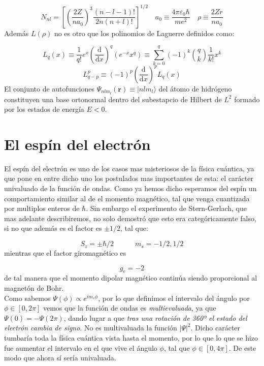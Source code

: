 \documentclass[12pt]{article}
\newcommand{\parentesis}[1]{\left( #1  \right)}
\newcommand{\ccorchetes}[1]{\left[ #1  \right]}
\newcommand{\D}{\mathrm{d}}
\newcommand{\derivadas}[2]{\frac{\D #1}{\D #2}}
\newcommand{\tquad}{\quad \quad \quad}
\newcommand{\rn}{\mathbf{r}}
\begin{document}
\begin{equation}
N_{nl} = \ccorchetes{\parentesis{\dfrac{2Z}{n a_0}}^3\dfrac{(n-l-1)!}{2n (n+l)!}}^{1/2} \quad a_0 \equiv \dfrac{4 \pi \varepsilon_0 \hbar}{m e^2} \quad \rho \equiv \dfrac{2 Z r}{n a_0}
\end{equation}
Además $L(\rho)$ no es otro que los polinomios de Laguerre definidos como:

\begin{equation}
 L_q (x) \equiv \dfrac{1}{q!} e^x \parentesis{\derivadas{}{x}}^q (e^{-x} x^q ) \equiv \sum_{k=0}^{q} (-1)^k  \binom{q}{k} \dfrac{1}{k!} x^k
\end{equation}
\begin{equation}
L_{q-p}^{p} \equiv (-1)^p \parentesis{\derivadas{}{x}}^p L_q(x) 
\end{equation}
El conjunto de autofunciones $\Psi_{n l m_l} (\rn ) \equiv | n l m_l \rangle$ del átomo de hidrógeno constituyen una base ortonormal dentro del subestapcio de Hilbert de $L^2$ formado por los estados de energía $E<0$.

\section{El espín del electrón}

El espín del electrón es uno de los casos mas misteriosos de la física cuántica, ya que pone en entre dicho uno los postulados mas importantes de esta: el carácter univaluado de la función de ondas. Como ya hemos dicho esperamos del espín un comportamiento similar al de el momento magnético, tal que venga cuantizada por multiplos enteros de $\hbar$. Sin embargo el experimento de Stern-Gerlach, que mas adelante describiremos, no solo demostró que esto era categóricamente falso, si no que además es el factor es $\pm 1/2$, tal que:

\begin{equation}
S_z = \pm \hbar / 2 \tquad m_s = -1/2, 1/2
\end{equation}
mientras que el factor giromagnético es

\begin{equation}
g_e = -2
\end{equation}
de tal manera que el momento dipolar magnético continúa siendo proporcional al magnetón de Bohr. \\

Como sabemos $ \Psi (\phi) \varpropto e^{i m_s \phi}$, por lo que definimos el intervalo del ángulo por $\phi \in [0,2\pi]$ vemos que la función de ondas es \textit{multievaluada}, ya que $\Psi(0) = - \Psi (2 \pi)$, dando lugar a que \textit{tras una rotación de 360º el estado del electrón cambia de signo}. No es multivaluada la función $|\Psi|^2$. Dicho carácter tumbaría toda la física cuántica vista hasta el momento, por lo que lo que se hizo fue aumentar el intervalo en el que vive el ángulo $\phi$, tal que  $\phi \in [0,4 \pi]$.  De este modo que ahora sí sería univaluada. \\ 
\end{document}
